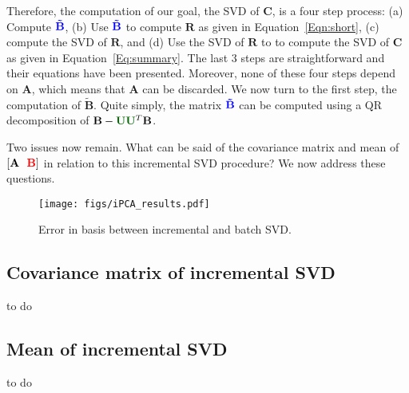 Therefore, the computation of our goal, the SVD of $\mathbf{C}$, is a four step process: (a) Compute ${\color{blue}\mathbf{\tilde{B}}}$, (b) Use ${\color{blue}\mathbf{\tilde{B}}}$ to compute $\mathbf{R}$ as given in Equation~\ref{Eqn:short}, (c) compute the SVD of $\mathbf{R}$, and (d) Use the SVD of $\mathbf{R}$ to to compute the SVD of $\mathbf{C}$ as given in Equation~\ref{Eq:summary}.  The last 3 steps are straightforward and their equations have been presented.  Moreover, none of these four steps depend on $\mathbf{A}$, which means that $\mathbf{A}$ can be discarded.  We now turn to the first step, the computation of $\mathbf{\tilde{B}}$.  Quite simply, the matrix ${\color{blue}\mathbf{\tilde{B}}}$ can be computed using a QR decomposition of $\mathbf{B}-{\color{darkgreen}\mathbf{U}}{\color{darkgreen}\mathbf{U}}^T\mathbf{B}$.  

Two issues now remain.  What can be said of the covariance matrix and mean of $\left[{\mathbf{A}} \ \ {\color{red}{\color{red}\mathbf{B}}}\right]$ in relation to this incremental SVD procedure?  We now address these questions.
								\begin{figure}[t]
								\centering
								\texttt{[image: figs/iPCA\_results.pdf]}
								\caption{Error in basis between incremental and batch SVD.}
								\label{iPCA_results}
								\end{figure}

\subsection{Covariance matrix of incremental SVD}
to do

\subsection{Mean of incremental SVD}
to do

